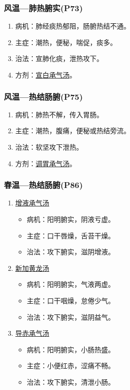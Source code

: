 \documentclass[cn,black,12pt,founder,normal,twocolumn]{elegantnote}
\begin{document}

\subsubsection{风温—肺热腑实(P73)}

\begin{enumerate}
    \item 病机：肺经痰热郁阻，肠腑热结不通。
    \item 主症：潮热，便秘，喘促，痰多。
    \item 治法：宣肺化痰，泄热攻下。
    \item 方剂：\uline{宣白承气汤}。
\end{enumerate}

\subsubsection{风温—热结肠腑(P75)}

\begin{enumerate}
    \item 病机：肺热不解，传入胃肠。
    \item 主症：潮热，腹痛，便秘或热结旁流。
    \item 治法：软坚攻下泄热。
    \item 方剂：\uline{调胃承气汤}。
\end{enumerate}

\subsubsection{春温—热结肠腑(P86)}

\begin{enumerate}
    \item \uline{增液承气汤}
    \begin{itemize}
        \item 病机：阳明腑实，阴液亏虚。
        \item 主症：口干唇燥，舌苔干燥。
        \item 治法：攻下腑实，滋阴增液。
    \end{itemize}
    \item \uline{新加黄龙汤}
    \begin{itemize}
        \item 病机：阳明腑实，气液两虚。
        \item 主症：口干咽燥，怠倦少气。
        \item 治法：攻下腑实，滋阴益气。
    \end{itemize}
    \item \uline{导赤承气汤}
    \begin{itemize}
        \item 病机：阳明腑实，小肠热盛。
        \item 主症：小便红赤，涩痛不畅。
        \item 治法：攻下腑实，清泄小肠。
    \end{itemize}
\end{enumerate}
\end{document}
